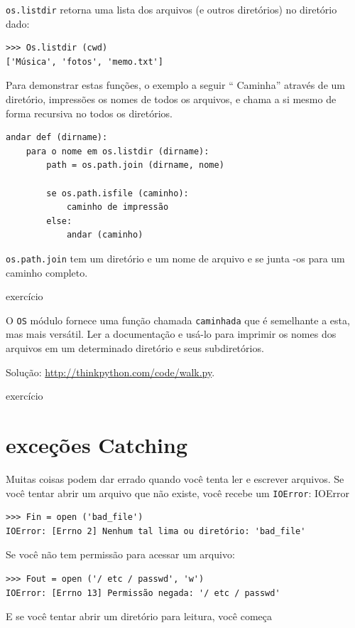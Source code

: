\documentclass[10pt]{book}
\begin{document}
\begin{v erbatim}
{\tt os.listdir} retorna uma lista dos arquivos (e outros diretórios)
no diretório dado:

\begin{verbatim}
>>> Os.listdir (cwd)
['Música', 'fotos', 'memo.txt']
\end{verbatim}
%
Para demonstrar estas funções, o exemplo a seguir
`` Caminha'' através de um diretório, impressões
os nomes de todos os arquivos, e chama a si mesmo de forma recursiva no
todos os diretórios.

\begin{verbatim}
andar def (dirname):
    para o nome em os.listdir (dirname):
        path = os.path.join (dirname, nome)

        se os.path.isfile (caminho):
            caminho de impressão
        else:
            andar (caminho)
\end{verbatim}
%
{\tt os.path.join} tem um diretório e um nome de arquivo e se junta
-os para um caminho completo.  

\begin{} exercício

O {\tt OS} módulo fornece uma função chamada {\tt caminhada}
que é semelhante a esta, mas mais versátil. Ler
a documentação e usá-lo para imprimir os nomes dos
arquivos em um determinado diretório e seus subdiretórios.

Solução: \url{http://thinkpython.com/code/walk.py}.

\end{} exercício


\section{exceções Catching}
\label{catch}

Muitas coisas podem dar errado quando você tenta ler e escrever
arquivos. Se você tentar abrir um arquivo que não existe, você recebe um
{\tt IOError}:
\index{} IOError

\begin{verbatim}
>>> Fin = open ('bad_file')
IOError: [Errno 2] Nenhum tal lima ou diretório: 'bad_file'
\end{verbatim}
%
Se você não tem permissão para acessar um arquivo:

\begin{verbatim}
>>> Fout = open ('/ etc / passwd', 'w')
IOError: [Errno 13] Permissão negada: '/ etc / passwd'
\end{verbatim}
%
E se você tentar abrir um diretório para leitura, você começa


\end{v erbatim}
\end{document}
